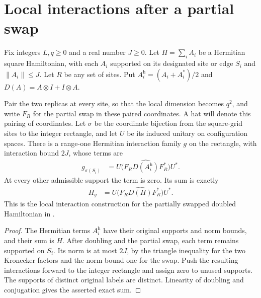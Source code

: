 \section{Local interactions after a partial swap}
\label{sec:swapped_square_interaction}

\begin{lemma}
    \label{thm:swapped_square_hamiltonian_interaction}
    \leanok
    Fix integers $L,q\ge0$ and a real number $J\ge0$. Let $H=\sum_i A_i$
    be a Hermitian square Hamiltonian, with each $A_i$ supported on its
    designated site or edge $S_i$ and $\|A_i\|\le J$. Let $R$ be any
    set of sites. Put $A_i^{\mathrm h}=(A_i+A_i^*)/2$ and
    $D(A)=A\otimes I+I\otimes A$.

    Pair the two replicas at every site, so that the local dimension
    becomes $q^2$, and write $F_R$ for the partial swap in these paired
    coordinates. A hat will denote this pairing of coordinates. Let
    $\sigma$ be the coordinate bijection from the square-grid sites to
    the integer rectangle, and let $U$ be its induced unitary on
    configuration spaces. There is a range-one Hermitian interaction
    family $g$ on the rectangle, with interaction bound $2J$, whose terms are
    \begin{align*}
        g_{\sigma(S_i)} & =U\bigl(F_R\widehat{D(A_i^{\mathrm h})}F_R^*\bigr)U^*.
    \end{align*}
    At every other admissible support the term is zero. Its sum is exactly
    \begin{align*}
        H_g & =U\bigl(F_R\widehat{D(H)}F_R^*\bigr)U^*.
    \end{align*}
    This is the local interaction construction for the partially swapped
    doubled Hamiltonian in \cite{OpenAI2026PolynomialPEPS}.
\end{lemma}
\begin{proof}
    \leanok
    The Hermitian terms $A_i^{\mathrm h}$ have their original supports and
    norm bounds, and their sum is $H$. After doubling and the partial swap,
    each term remains supported on $S_i$. Its norm is at most $2J$, by
    the triangle inequality for the two Kronecker factors and the norm
    bound one for the swap. Push the resulting interactions forward to the integer rectangle
    and assign zero to unused supports. The supports of distinct original
    labels are distinct. Linearity of doubling and conjugation gives the
    asserted exact sum.
\end{proof}
